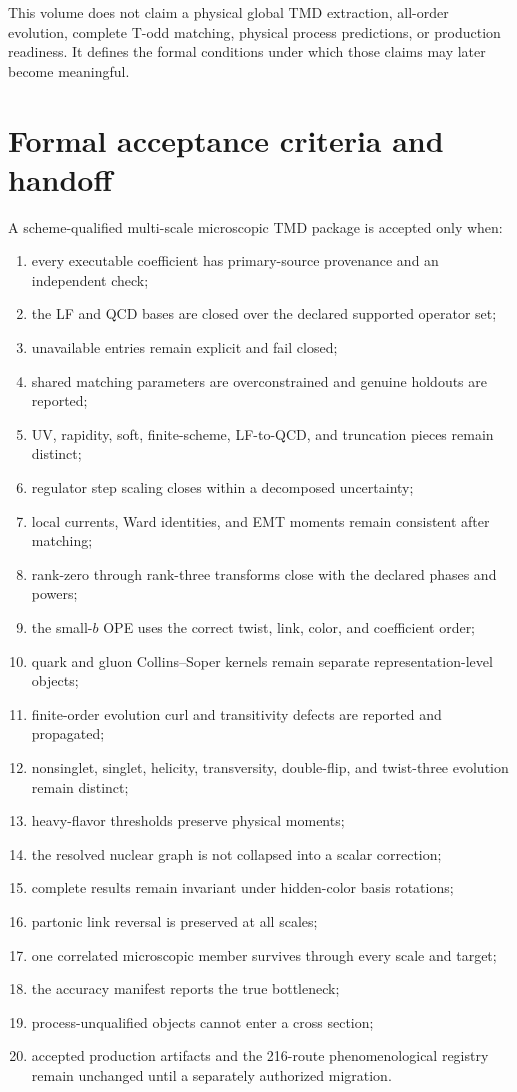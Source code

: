 \documentclass[11pt]{article}
\begin{document}
This volume does not claim a physical global TMD extraction, all-order evolution, complete T-odd matching, physical process predictions, or production readiness.  It defines the formal conditions under which those claims may later become meaningful.

\section{Formal acceptance criteria and handoff}
\label{sec:acceptance}

A scheme-qualified multi-scale microscopic TMD package is accepted only when:
\begin{enumerate}
\item every executable coefficient has primary-source provenance and an independent check;
\item the LF and QCD bases are closed over the declared supported operator set;
\item unavailable entries remain explicit and fail closed;
\item shared matching parameters are overconstrained and genuine holdouts are reported;
\item UV, rapidity, soft, finite-scheme, LF-to-QCD, and truncation pieces remain distinct;
\item regulator step scaling closes within a decomposed uncertainty;
\item local currents, Ward identities, and EMT moments remain consistent after matching;
\item rank-zero through rank-three transforms close with the declared phases and powers;
\item the small-\(b\) OPE uses the correct twist, link, color, and coefficient order;
\item quark and gluon Collins--Soper kernels remain separate representation-level objects;
\item finite-order evolution curl and transitivity defects are reported and propagated;
\item nonsinglet, singlet, helicity, transversity, double-flip, and twist-three evolution remain distinct;
\item heavy-flavor thresholds preserve physical moments;
\item the resolved nuclear graph is not collapsed into a scalar correction;
\item complete results remain invariant under hidden-color basis rotations;
\item partonic link reversal is preserved at all scales;
\item one correlated microscopic member survives through every scale and target;
\item the accuracy manifest reports the true bottleneck;
\item process-unqualified objects cannot enter a cross section;
\item accepted production artifacts and the 216-route phenomenological registry remain unchanged until a separately authorized migration.
\end{enumerate}
\end{document}
